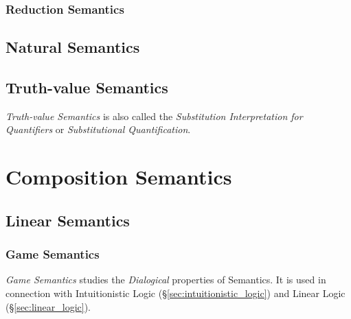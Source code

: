 \subsubsection{Reduction Semantics}\label{sec:reduction_semantics}



\subsection{Natural Semantics}\label{sec:natural_semantics}



\subsection{Truth-value Semantics}\label{sec:truthvalue_semantics}

\emph{Truth-value Semantics} is also called the \emph{Substitution
  Interpretation for Quantifiers} or \emph{Substitutional
  Quantification}.



\section{Composition Semantics}\label{sec:composition_semantics}

\subsection{Linear Semantics}\label{sec:linear_semantics}

\subsubsection{Game Semantics}\label{sec:game_semantics}

\emph{Game Semantics} studies the \emph{Dialogical} properties of
Semantics. It is used in connection with Intuitionistic Logic
(\S\ref{sec:intuitionistic_logic}) and Linear Logic
(\S\ref{sec:linear_logic}).

